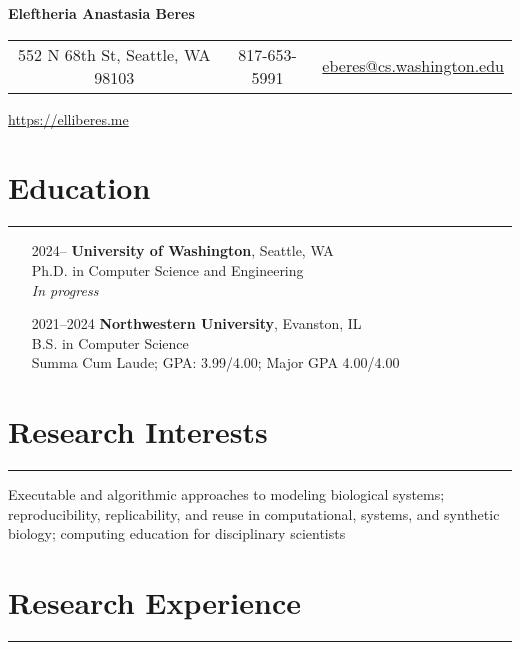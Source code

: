 \documentclass{article}
\begin{document}

\begin{center}
    \textbf{\huge{Eleftheria Anastasia Beres}}

    \vspace{10pt}

    \begin{tabular}{c c c}
        552 N 68th St, Seattle, WA 98103 & 817-653-5991 & \href{mailto:eberes@cs.washington.edu}{eberes@cs.washington.edu}
    \end{tabular}

    \vspace{5pt}

    \href{https://elliberes.me}{https://elliberes.me}
    
\end{center}

\section*{Education}
\hrule
\vspace{10pt}

\begin{itemize}[leftmargin=1.5in]
    \item[2024–] \textbf{University of Washington}, Seattle, WA\\
    Ph.D. in Computer Science and Engineering\\
    \textit{In progress}
    \item[2021–2024] \textbf{Northwestern University}, Evanston, IL\\
    B.S. in Computer Science\\
    Summa Cum Laude; GPA: 3.99/4.00; Major GPA 4.00/4.00
\end{itemize}

\section*{Research Interests}
\hrule
\vspace{10pt}

Executable and algorithmic approaches to modeling biological systems; reproducibility, replicability, and reuse in computational, systems, and synthetic biology; computing education for disciplinary scientists

\section*{Research Experience}
\hrule
\vspace{10pt}
\end{document}
